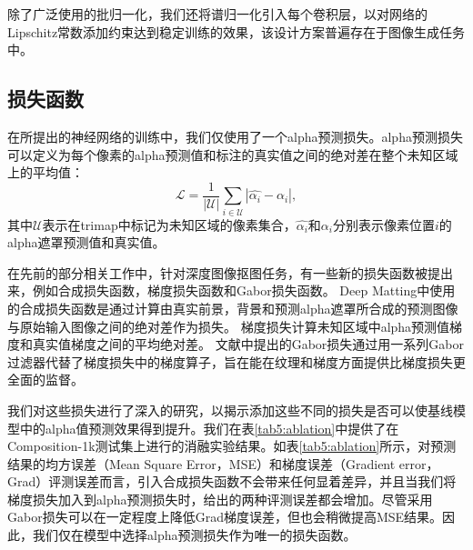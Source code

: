 除了广泛使用的批归一化\cite{ioffe2015batch}，我们还将谱归一化\cite{miyato2018spectral}引入每个卷积层，以对网络的Lipschitz常数添加约束达到稳定训练的效果，该设计方案普遍存在于图像生成任务中\cite{brock2018large,zhang2018self}。

\subsection{损失函数}
在所提出的神经网络的训练中，我们仅使用了一个alpha预测损失。alpha预测损失可以定义为每个像素的alpha预测值和标注的真实值之间的绝对差在整个未知区域上的平均值：
\begin{equation}
\mathcal{L} = \frac{1}{|\mathcal{U}|} \sum_{i\in \mathcal{U}}|\hat{\alpha_i}-\alpha_i|,
\label{eq5:loss}
\end{equation}
其中$ \mathcal {U} $表示在trimap中标记为未知区域的像素集合，$ \hat{\alpha_i} $和$ \alpha_i $分别表示像素位置$ i $的alpha遮罩预测值和真实值。

在先前的部分相关工作中，针对深度图像抠图任务，有一些新的损失函数被提出来，例如合成损失函数\cite{xu2017deep}，梯度损失函数\cite{samplenet}和Gabor损失函数\cite{li2019inductive}。
Deep Matting\cite{xu2017deep}中使用的合成损失函数是通过计算由真实前景，背景和预测alpha遮罩所合成的预测图像与原始输入图像之间的绝对差作为损失。
梯度损失计算未知区域中alpha预测值梯度和真实值梯度之间的平均绝对差。
文献\parencite{li2019inductive}中提出的Gabor损失通过用一系列Gabor过滤器代替了梯度损失中的梯度算子，旨在能在纹理和梯度方面提供比梯度损失更全面的监督。

我们对这些损失进行了深入的研究，以揭示添加这些不同的损失是否可以使基线模型中的alpha值预测效果得到提升。我们在表\ref{tab5:ablation}中提供了在Composition-1k测试集\cite{xu2017deep}上进行的消融实验结果。如表\ref{tab5:ablation}所示，对预测结果的均方误差（Mean Square Error，MSE）和梯度误差（Gradient error，Grad）评测误差而言，引入合成损失函数不会带来任何显着差异，并且当我们将梯度损失加入到alpha预测损失时，给出的两种评测误差都会增加。尽管采用Gabor损失可以在一定程度上降低Grad梯度误差，但也会稍微提高MSE结果。因此，我们仅在模型中选择alpha预测损失作为唯一的损失函数。


